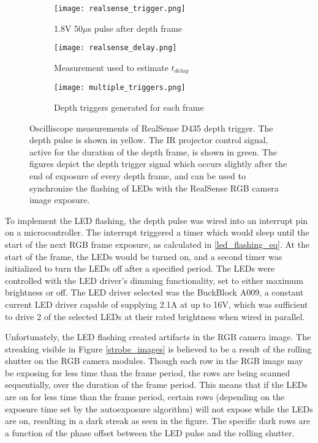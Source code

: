 \begin{figure}
	\centering
	\begin{subfigure}{0.32\textwidth}
		\texttt{[image: realsense\_trigger.png]}
		\caption{1.8V 50$\mu$s pulse after depth frame}
		\label{realsense_trigger}
	\end{subfigure}		
	\hfill
	\begin{subfigure}{0.32\textwidth}
		\texttt{[image: realsense\_delay.png]}
		\caption{Measurement used to estimate $t_{delay}$}
		\label{realsense_delay}		
	\end{subfigure}
	\hfill
	\begin{subfigure}{0.32\textwidth}
		\texttt{[image: multiple\_triggers.png]}
		\caption{Depth triggers generated for each frame}
		\label{multiple_triggers}
	\end{subfigure}	
	\caption[Oscilliscope measurements of RealSense D435 depth trigger]{Oscilliscope measurements of RealSense D435 depth trigger. The depth pulse is shown in yellow. The IR projector control signal, active for the duration of the depth frame, is shown in green. The figures depict the depth trigger signal which occurs slightly after the end of exposure of every depth frame, and can be used to synchronize the flashing of LEDs with the RealSense RGB camera image exposure.}
	\label{realsense_scope}
\end{figure}	

To implement the LED flashing, the depth pulse was wired into an interrupt pin on a microcontroller. The interrupt triggered a timer which would sleep until the start of the next RGB frame exposure, as calculated in \ref{led_flashing_eq}. At the start of the frame, the LEDs would be turned on, and a second timer was initialized to turn the LEDs off after a specified period. The LEDs were controlled with the LED driver's dimming functionality, set to either maximum brightness or off. The LED driver selected was the BuckBlock A009, a constant current LED driver capable of supplying 2.1A at up to 16V, which was sufficient to drive 2 of the selected LEDs at their rated brightness when wired in parallel. 

Unfortunately, the LED flashing created artifacts in the RGB camera image. The streaking visible in Figure \ref{strobe_images} is believed to be a result of the rolling shutter on the RGB camera modules. Though each row in the RGB image may be exposing for less time than the frame period, the rows are being scanned sequentially, over the duration of the frame period. This means that if the LEDs are on for less time than the frame period, certain rows (depending on the exposure time set by the autoexposure algorithm) will not expose while the LEDs are on, resulting in a dark streak as seen in the figure. The specific dark rows are a function of the phase offset between the LED pulse and the rolling shutter.

